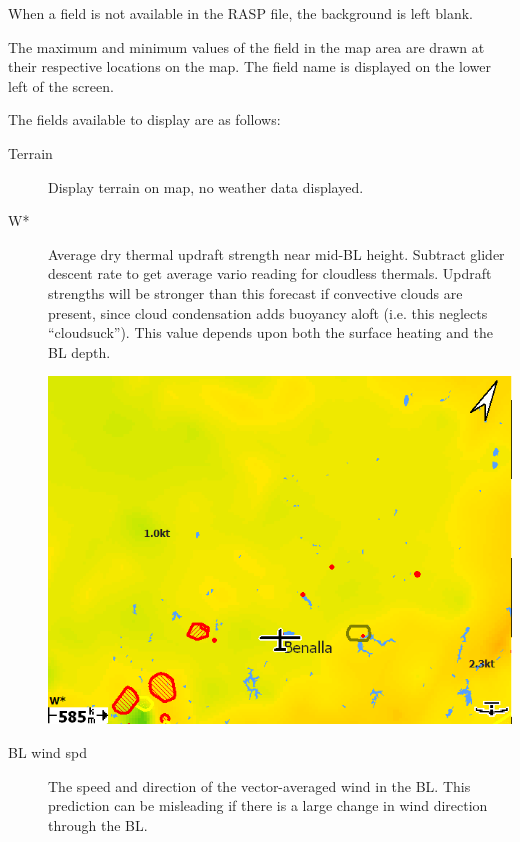 \documentclass[a4paper,12pt]{refrep}
\begin{document}
When a field is not available in the RASP file, the background is left blank.

The maximum and minimum values of the field in the map area are drawn
at their respective locations on the map.  The field name is displayed
on the lower left of the screen.

The fields available to display are as follows:
\begin{description}
\item[Terrain] Display terrain on map, no weather data displayed.

\item[W*] 
Average dry thermal updraft strength near mid-BL height.  Subtract
glider descent rate to get average vario reading for cloudless
thermals.  Updraft strengths will be stronger than this forecast if
convective clouds are present, since cloud condensation adds buoyancy
aloft (i.e. this neglects ``cloudsuck'').  This value depends upon both
the surface heating and the BL depth.

\begin{center}
\includegraphics[angle=0,width=\linewidth,keepaspectratio='true']{figures/rasp-wstar.png}
\end{center}

\item[BL wind spd] 
The speed and direction of the vector-averaged wind in the BL.  This
prediction can be misleading if there is a large change in wind
direction through the BL.


\end{description}
\end{document}
